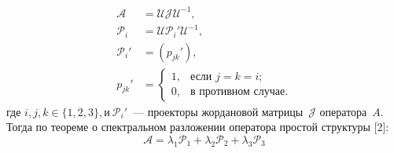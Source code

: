 $$
	\begin{aligned}
		\mathcal{A} &= \mathcal{U}\mathcal{J}\mathcal{U}^{-1}, \\
		\mathcal{P}_i &= \mathcal{U}\mathcal{P}_i'\mathcal{U}^{-1}, \\
		\mathcal{P}_i' &= \left(p_{jk}'\right), \\
		p_{jk}' &= 
		\begin{cases}
			1, & \text{если $j=k=i$;} \\
			0, & \text{в противном случае.}
		\end{cases}
	\end{aligned}
$$
где $i,j,k \in \{1,2,3\}, \text{и}\  \mathcal{P}_i'$~--- проекторы жордановой матрицы~$\mathcal{J}$ 
оператора~$A$. Тогда по теореме о спектральном разложении оператора простой структуры [2]:
$$
	\mathcal{A} = \lambda_1\mathcal{P}_1 + \lambda_2\mathcal{P}_2 + \lambda_3\mathcal{P}_3 
$$


